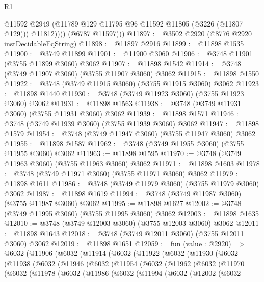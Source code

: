 \begin{lexlean}{R1}
\begin{coremodule}
                @11592
                @2949
                (@11789 @129 @11795 @96 @11592 @11805 (@3226 (@11807 @129)))
                @11812))))
        (@6787 @11597)))
@11897 := @3502 @2920 (@8776 @2920 instDecidableEqString)
@11898 := @11897 @2916
@11899 := @11898 @1535
@11900 := @3749 @11899
@11901 := @11900 @3060
@11906 := @3748 @11901 (@3755 @11899 @3060) @3062
@11907 := @11898 @1542
@11914 := @3748 (@3749 @11907 @3060) (@3755 @11907 @3060) @3062
@11915 := @11898 @1550
@11922 := @3748 (@3749 @11915 @3060) (@3755 @11915 @3060) @3062
@11923 := @11898 @1440
@11930 := @3748 (@3749 @11923 @3060) (@3755 @11923 @3060) @3062
@11931 := @11898 @1563
@11938 := @3748 (@3749 @11931 @3060) (@3755 @11931 @3060) @3062
@11939 := @11898 @1571
@11946 := @3748 (@3749 @11939 @3060) (@3755 @11939 @3060) @3062
@11947 := @11898 @1579
@11954 := @3748 (@3749 @11947 @3060) (@3755 @11947 @3060) @3062
@11955 := @11898 @1587
@11962 := @3748 (@3749 @11955 @3060) (@3755 @11955 @3060) @3062
@11963 := @11898 @1595
@11970 := @3748 (@3749 @11963 @3060) (@3755 @11963 @3060) @3062
@11971 := @11898 @1603
@11978 := @3748 (@3749 @11971 @3060) (@3755 @11971 @3060) @3062
@11979 := @11898 @1611
@11986 := @3748 (@3749 @11979 @3060) (@3755 @11979 @3060) @3062
@11987 := @11898 @1619
@11994 := @3748 (@3749 @11987 @3060) (@3755 @11987 @3060) @3062
@11995 := @11898 @1627
@12002 := @3748 (@3749 @11995 @3060) (@3755 @11995 @3060) @3062
@12003 := @11898 @1635
@12010 := @3748 (@3749 @12003 @3060) (@3755 @12003 @3060) @3062
@12011 := @11898 @1643
@12018 := @3748 (@3749 @12011 @3060) (@3755 @12011 @3060) @3062
@12019 := @11898 @1651
@12059 := fun (value : @2920) =>
  @6032
    (@11906
      (@6032
        (@11914
          (@6032
            (@11922
              (@6032
                (@11930
                  (@6032
                    (@11938
                      (@6032
                        (@11946
                          (@6032
                            (@11954
                              (@6032
                                (@11962
                                  (@6032
                                    (@11970
                                      (@6032
                                        (@11978
                                          (@6032
                                            (@11986
                                              (@6032
                                                (@11994
                                                  (@6032
                                                    (@12002
                                                      (@6032

\end{coremodule}
\end{lexlean}
